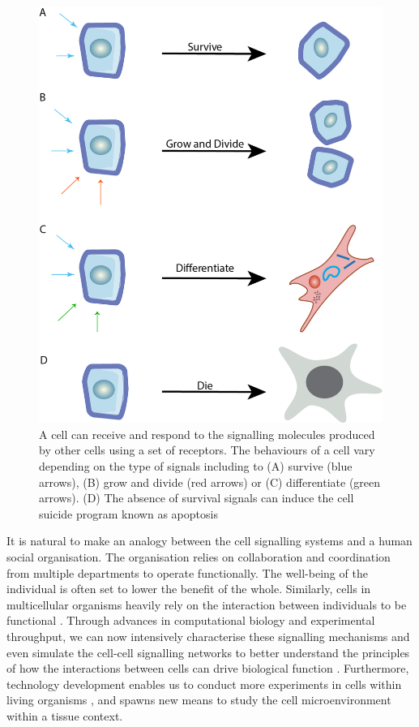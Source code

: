 \begin{figure}[htp]
    \centering
    \includegraphics[width=0.6\columnwidth]{Chapter1/Figures/Chap1_figure1.png}
    \caption[Cell relies on multiple extracellular signalling molecules to survive.]{A cell can receive and respond to the signalling molecules produced by other cells using a set of receptors. The behaviours of a cell vary depending on the type of signals including to (A) survive (blue arrows), (B) grow and divide (red arrows) or (C) differentiate (green arrows). (D) The absence of survival signals can induce the cell suicide program known as apoptosis}
    \label{fig:Chap1_figure1}
\end{figure}

It is natural to make an analogy between the cell signalling systems and a human social organisation. The organisation relies on collaboration and coordination from multiple departments to operate functionally. The well-being of the individual is often set to lower the benefit of the whole. Similarly, cells in multicellular organisms heavily rely on the interaction between individuals to be functional \cite{bartee2018principles}. Through advances in computational biology and experimental throughput, we can now intensively characterise these signalling mechanisms and even simulate the cell-cell signalling networks to better understand the principles of how the interactions between cells can drive biological function \cite{sprinzak2010cis, teague2016synthetic, toda2019engineering}. Furthermore, technology development enables us to conduct more experiments in cells within living organisms \cite{helmchen2005deep, periasamy2013methods}, and spawns new means to study the cell microenvironment within a tissue context. 


